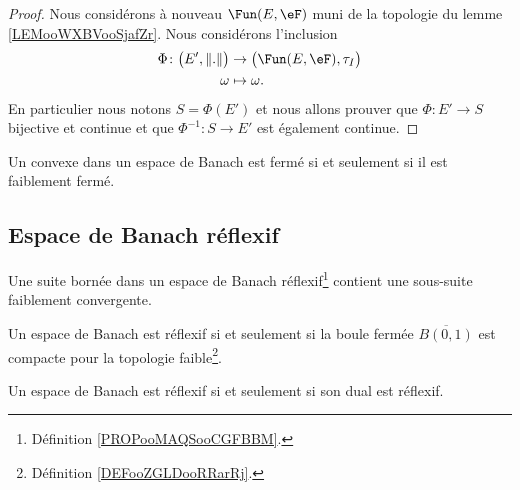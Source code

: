 \begin{proof}
	Nous considérons à nouveau \( \Fun(E, \eF)\) muni de la topologie du lemme \ref{LEMooWXBVooSjafZr}. Nous considérons l'inclusion
	\begin{equation}
		\begin{aligned}
			\Phi\colon \big( E',\| . \| \big) & \to \big( \Fun(E,\eF), \tau_I \big) \\
			\omega                            & \mapsto \omega.
		\end{aligned}
	\end{equation}
	En particulier nous notons \( S=\Phi(E')\) et nous allons prouver que \( \Phi\colon E'\to S\) bijective et continue et que \( \Phi^{-1}\colon S\to E'\) est également continue.
\end{proof}



\begin{proposition}       \label{PROPooYARHooOpmztY}
	Un convexe dans un espace de Banach est fermé si et seulement si il est faiblement fermé.
\end{proposition}

\subsection{Espace de Banach réflexif}

\begin{proposition}       \label{PROPooPVVYooMZjQSq}
	Une suite bornée dans un espace de Banach réflexif\footnote{Définition \ref{PROPooMAQSooCGFBBM}.} contient une sous-suite faiblement convergente.
\end{proposition}

\begin{theorem}       \label{THOooTFIHooPQjVAr}
	Un espace de Banach est réflexif si et seulement si la boule fermée \( \overline{ B(0,1) }\) est compacte pour la topologie faible\footnote{Définition \ref{DEFooZGLDooRRarRj}.}.
\end{theorem}

\begin{proposition}       \label{PROPooBBNBooGcXDRH}
	Un espace de Banach est réflexif si et seulement si son dual est réflexif.
\end{proposition}

